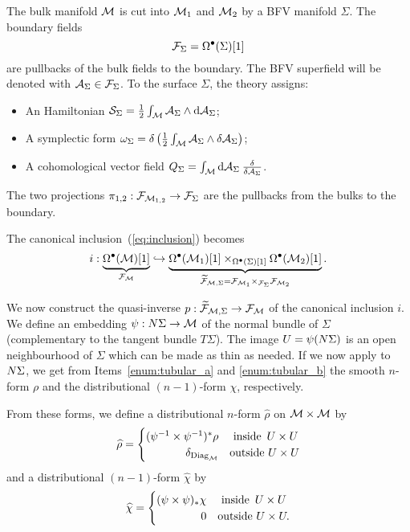The bulk manifold $\mathcal{M}$ is cut into $\mathcal{M}_1$ and $\mathcal{M}_2$ by a BFV manifold $\Sigma$.
The boundary fields
\begin{equation*}
    \mathcal{F}_\Sigma = \Omega^\bullet (\Sigma)[1]
\end{equation*}
are pullbacks of the bulk fields to the boundary. The BFV superfield will be denoted with $\mathcal{A}_\Sigma \in \mathcal{F}_\Sigma$.
To the surface $\Sigma$, the theory assigns:
\begin{itemize} %
    \item An Hamiltonian $\mathcal{S}_\Sigma = \frac{1}{2}\int_{\mathcal{M}} \mathcal{A}_\Sigma \wedge \dd \mathcal{A}_\Sigma$;
    \item A symplectic form $\omega_\Sigma = \delta \left( \frac{1}{2} \int_{\mathcal{M}} \mathcal{A}_\Sigma \wedge \delta \mathcal{A}_\Sigma \right)$;
    \item A cohomological vector field $Q_\Sigma = \int_{\mathcal{M}} \dd \mathcal{A}_\Sigma \: \frac{\delta}{\delta \mathcal{A}_\Sigma}$.
\end{itemize}

The two projections $\pi_{1,2} : \mathcal{F}_{\mathcal{M}_{1,2}} \rightarrow \mathcal{F}_\Sigma$ are the pullbacks from the bulks to the boundary.

The canonical inclusion~(\ref{eq:inclusion}) becomes
\begin{equation*}
    i : \underbrace{\Omega^\bullet (\mathcal{M})[1]}_{\mathcal{F}_{\mathcal{M}}} \hookrightarrow 
    \underbrace{\Omega^\bullet (\mathcal{M}_1)[1] \times_{\Omega^\bullet (\Sigma)[1]} \Omega^\bullet (\mathcal{M}_2)[1]}_{\widetilde{\mathcal{F}}_{\mathcal{M}, \Sigma} = \mathcal{F}_{\mathcal{M}_1} \times_{\mathcal{F}_\Sigma} \mathcal{F}_{\mathcal{M}_2}} .
\end{equation*}

We now construct the quasi-inverse $p: \widetilde{\mathcal{F}}_{\mathcal{M}, \Sigma} \rightarrow \mathcal{F}_{\mathcal{M}}$ of the canonical inclusion $i$.
We define an embedding $\psi: N \Sigma \rightarrow \mathcal{M}$ of the normal bundle of $\Sigma$ (complementary to the tangent bundle $T\Sigma$).
The image $U = \psi(N \Sigma)$ is an open neighbourhood of $\Sigma$ which can be made as thin as needed.
If we now apply  to $N \Sigma$, we get from Items~\ref{enum:tubular_a} and \ref{enum:tubular_b} the smooth $n$-form $\rho$ and the distributional $(n-1)$-form $\chi$, respectively.

From these forms, we define a distributional $n$-form $\hat{\rho}$ on $\mathcal{M} \times \mathcal{M}$ by
\begin{equation*}
    \hat{\rho} = 
        \begin{cases}
            (\psi^{-1} \times \psi^{-1})^* \rho & \text{ inside } \,  U \times U \\
             \hfill \delta_{\diag_\M}           &\text{outside } U \times U
        \end{cases}
\end{equation*}
and a distributional $(n-1)$-form $\hat{\chi}$ by
\begin{equation*}
    \hat{\chi} = 
        \begin{cases}
            (\psi \times \psi)_* \chi & \text{ inside } \,  U \times U \\
             \hfill 0                 &\text{outside } U \times U .
        \end{cases}
\end{equation*}


